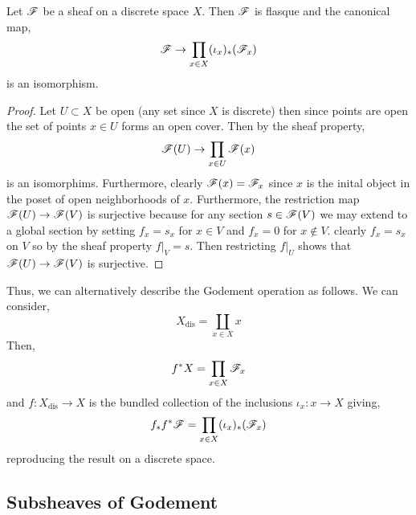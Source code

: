 \documentclass[12pt]{article}
\begin{document}
\begin{lemma}
Let $\mathscr{F}$ be a sheaf on a discrete space $X$. Then $\mathscr{F}$ is flasque and the canonical map,
\[ \mathscr{F} \to \prod_{x \in X} (\iota_x)_* (\mathscr{F}_x) \]
is an isomorphism.
\end{lemma}

\begin{proof}
Let $U \subset X$ be open (any set since $X$ is discrete) then since points are open the set of points $x \in U$ forms an open cover. Then by the sheaf property,
\[ \mathscr{F}(U) \to \prod_{x \in U} \mathscr{F}(x) \]
is an isomorphims. Furthermore, clearly $\mathscr{F}(x) = \mathscr{F}_x$ since $x$ is the inital object in the poset of open neighborhoods of $x$. Furthermore, the restriction map $\mathscr{F}(U) \to \mathscr{F}(V)$ is surjective because for any section $s \in \mathscr{F}(V)$ we may extend to a global section by setting $f_x = s_x$ for $x \in V$ and $f_x = 0$ for $x \notin V$. clearly $f_x = s_x$ on $V$ so by the sheaf property $f|_V = s$. Then restricting $f|_U$ shows that $\mathscr{F}(U) \to \mathscr{F}(V)$ is surjective.
\end{proof}
\noindent
Thus, we can alternatively describe the Godement operation as follows. We can consider,
\[ X_{\text{dis}} = \coprod_{x \in X} x \]
Then,
\[ f^* X = \prod_{x \in X} \mathscr{F}_x \]
and $f : X_{\text{dis}} \to X$ is the bundled collection of the inclusions $\iota_x : x \to X$ giving,
\[ f_* f^* \mathscr{F} = \prod_{x \in X} (\iota_x)_* (\mathscr{F}_x) \]
reproducing the result on a discrete space.

\subsection{Subsheaves of Godement}
\end{document}
